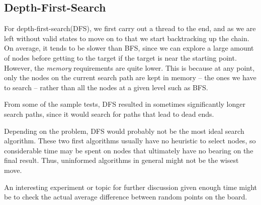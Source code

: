 \documentclass{article}
\begin{document}
\subsection{Depth-First-Search}
	For depth-first-search(DFS), we first carry out a thread to the end, and as we are left without valid 
	states to move on to that we start backtracking up the chain. On average, it tends to be slower than
	BFS, since we can explore a large amount of nodes before getting to the target if the target is near
	the starting point. However, the \textit{memory} requirements are quite lower. This is because at any 
	point, only the nodes on the current search path are kept in memory -- the ones we have to search --
	rather than all the nodes at a given level such as BFS. 

	
	From some of the sample tests, DFS resulted in sometimes significantly longer search paths,
	since it would search for paths that lead to dead ends.

	Depending on the problem, DFS would probably not be the most ideal search algorithm. These two first
	algorithms usually have no heuristic to select nodes, so considerable time may be spent on nodes
	that ultimately have no bearing on the final result. Thus, uninformed algorithms in general might
	not be the wisest move. 
	
	An interesting experiment or topic for further discussion given enough time might be 
	to check the actual average difference between random points on the board. 
\end{document}
